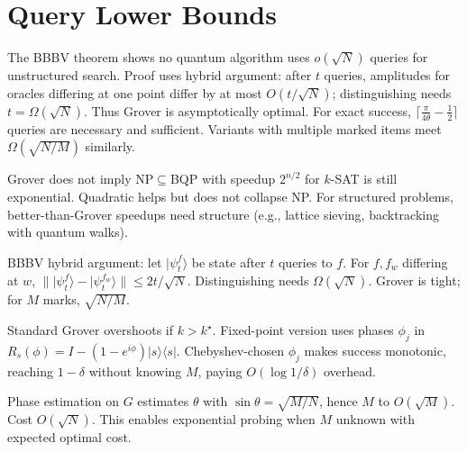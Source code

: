\section{Query Lower Bounds}
The BBBV theorem shows no quantum algorithm uses $o(\sqrt N)$ queries for unstructured search. Proof uses hybrid argument: after $t$ queries, amplitudes for oracles differing at one point differ by at most $O(t/\sqrt N)$; distinguishing needs $t=\Omega(\sqrt N)$. Thus Grover is asymptotically optimal. For exact success, $\lceil\frac{\pi}{4\theta}-\frac12\rceil$ queries are necessary and sufficient. Variants with multiple marked items meet $\Omega(\sqrt{N/M})$ similarly.

\begin{remark}
Grover does not imply NP$\subseteq$BQP with speedup $2^{n/2}$ for $k$-SAT is still exponential. Quadratic helps but does not collapse NP. For structured problems, better-than-Grover speedups need structure (e.g., lattice sieving, backtracking with quantum walks).
\end{remark}


\begin{remark}
BBBV hybrid argument: let $\lvert\psi_t^f\rangle$ be state after $t$ queries to $f$. For $f,f_w$ differing at $w$, $\|\lvert\psi_t^f\rangle-\lvert\psi_t^{f_w}\rangle\|\le2t/\sqrt N$. Distinguishing needs $\Omega(\sqrt N)$. Grover is tight; for $M$ marks, $\sqrt{N/M}$.
\end{remark}

\begin{example}
Standard Grover overshoots if $k>k^\star$. Fixed-point version uses phases $\phi_j$ in $R_s(\phi)=I-(1-e^{i\phi})\lvert s\rangle\langle s\rvert$. Chebyshev-chosen $\phi_j$ makes success monotonic, reaching $1-\delta$ without knowing $M$, paying $O(\log1/\delta)$ overhead.
\end{example}

\begin{remark}
Phase estimation on $G$ estimates $\theta$ with $\sin\theta=\sqrt{M/N}$, hence $M$ to $O(\sqrt M)$. Cost $O(\sqrt N)$. This enables exponential probing when $M$ unknown with expected optimal cost.
\end{remark}

